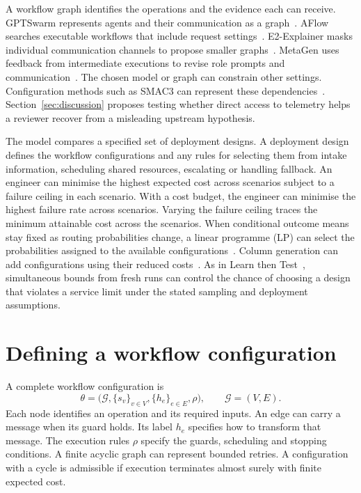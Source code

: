 \documentclass[11pt,reqno]{amsart}
\theoremstyle{definition}
\theoremstyle{remark}
\begin{document}
A workflow graph identifies the operations and the evidence each can receive.
GPTSwarm represents agents and their communication as a graph~\cite{gptswarm}.
AFlow searches executable workflows that include request settings~\cite{aflow}.
E2-Explainer masks individual communication channels to propose smaller graphs~\cite{e2explainer2026}.
MetaGen uses feedback from intermediate executions to revise role prompts and communication~\cite{metagen2026}.
The chosen model or graph can constrain other settings. Configuration methods such as SMAC3 can represent these dependencies~\cite{smac3}.
Section~\ref{sec:discussion} proposes testing whether direct access to telemetry helps a reviewer recover from a misleading upstream hypothesis.

The model compares a specified set of deployment designs. A deployment design defines the workflow configurations and any rules for selecting them from intake information, scheduling shared resources, escalating or handling fallback.
An engineer can minimise the highest expected cost across scenarios subject to a failure ceiling in each scenario. With a cost budget, the engineer can minimise the highest failure rate across scenarios.
Varying the failure ceiling traces the minimum attainable cost across the scenarios.
When conditional outcome means stay fixed as routing probabilities change, a linear programme (LP) can select the probabilities assigned to the available configurations~\cite{boyd}.
Column generation can add configurations using their reduced costs~\cite{dantzigwolfe}.
As in Learn then Test~\cite{ltt}, simultaneous bounds from fresh runs can control the chance of choosing a design that violates a service limit under the stated sampling and deployment assumptions.

\section{Defining a workflow configuration}
\label{sec:configuration}

A complete workflow configuration is
\begin{equation}
 \theta=\bigl(\mathcal G,\{s_v\}_{v\in V},\{h_e\}_{e\in E},\rho\bigr),
 \qquad \mathcal G=(V,E).
 \label{eq:configuration}
\end{equation}
Each node identifies an operation and its required inputs.
An edge can carry a message when its guard holds. Its label $h_e$ specifies how to transform that message.
The execution rules $\rho$ specify the guards, scheduling and stopping conditions.
A finite acyclic graph can represent bounded retries.
A configuration with a cycle is admissible if execution terminates almost surely with finite expected cost.
\end{document}
